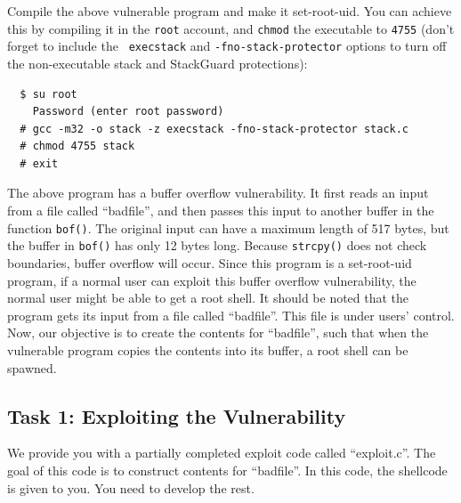 Compile the above vulnerable program and make it set-root-uid. You
can achieve this by compiling it in the {\tt root} account, and 
{\tt chmod} the executable to {\tt 4755} (don't forget to include the {\tt
execstack} and {\tt -fno-stack-protector} options to turn off
the non-executable stack and StackGuard protections):

\begin{verbatim}
  $ su root 
    Password (enter root password)
  # gcc -m32 -o stack -z execstack -fno-stack-protector stack.c
  # chmod 4755 stack
  # exit  
\end{verbatim}



The above program has a buffer overflow vulnerability. It first 
reads an input from a file called ``badfile'', and then passes this
input to another buffer in the function {\tt bof()}. The 
original input can have a maximum length of 517 bytes, but the buffer
in {\tt bof()} has only 12 bytes long. Because {\tt strcpy()} does not check
boundaries, buffer overflow will occur.
Since this program is a set-root-uid program, if a normal user can exploit
this buffer overflow vulnerability, the normal user might be 
able to get a root shell.
It should be noted that 
the program gets its input from a file called ``badfile''. This file
is under users' control. Now, our objective is to 
create the contents for ``badfile'', such that when the vulnerable program
copies the contents into its buffer, a root shell can be spawned.



\subsection{Task 1: Exploiting the Vulnerability} 

We provide you with a partially completed exploit code called 
``exploit.c''. The goal of this code is to construct contents 
for ``badfile''. In this code, the shellcode is given to you. 
You need to develop the rest. 


